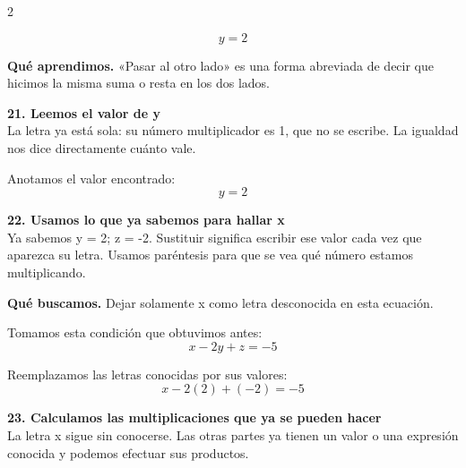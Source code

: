 \documentclass[11pt,a4paper,landscape]{article}
\begin{document}
\begin{multicols*}{2}
\begin{minipage}{\linewidth}
\[y=2\]
\par\smallskip\textbf{Qué aprendimos.} «Pasar al otro lado» es una forma abreviada de decir que hicimos la misma suma o resta en los dos lados.
\end{minipage}\par\medskip
\noindent\begin{minipage}{\linewidth}\textbf{21. Leemos el valor de y}\\[2pt]La letra ya está sola: su número multiplicador es 1, que no se escribe. La igualdad nos dice directamente cuánto vale.
\par\smallskip Anotamos el valor encontrado:
\[y=2\]
\end{minipage}\par\medskip
\noindent\begin{minipage}{\linewidth}\textbf{22. Usamos lo que ya sabemos para hallar x}\\[2pt]Ya sabemos y = 2; z = -2. Sustituir significa escribir ese valor cada vez que aparezca su letra. Usamos paréntesis para que se vea qué número estamos multiplicando.
\par\smallskip\textbf{Qué buscamos.} Dejar solamente x como letra desconocida en esta ecuación.
\par\smallskip Tomamos esta condición que obtuvimos antes:
\[x - 2y + z = -5\]
\par\smallskip Reemplazamos las letras conocidas por sus valores:
\[x - 2\left(2\right) + \left(-2\right)=-5\]
\end{minipage}\par\medskip
\noindent\begin{minipage}{\linewidth}\textbf{23. Calculamos las multiplicaciones que ya se pueden hacer}\\[2pt]La letra x sigue sin conocerse. Las otras partes ya tienen un valor o una expresión conocida y podemos efectuar sus productos.
\par{}\par\smallskip

\end{minipage}
\end{multicols*}
\end{document}
